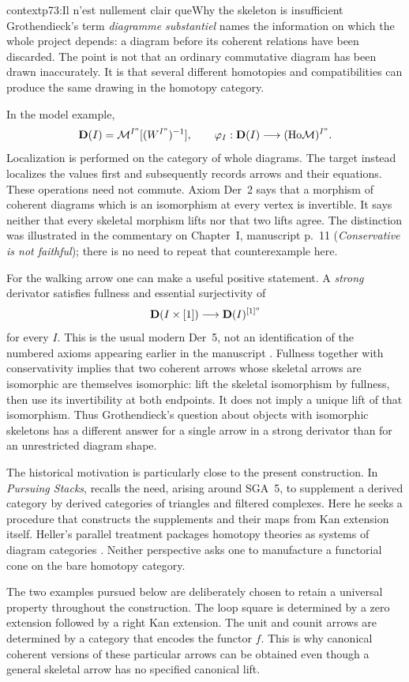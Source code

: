 \begin{dcomment}{context}{p73:Il n'est nullement clair que}{Why the skeleton is insufficient}
Grothendieck's term \emph{diagramme substantiel} names the information on which the whole project depends: a diagram before its coherent relations have been discarded. The point is not that an ordinary commutative diagram has been drawn inaccurately. It is that several different homotopies and compatibilities can produce the same drawing in the homotopy category.

In the model example,
\[
 \mathbf{D}(I)=\mathcal M^{I^o}[(W^{I^o})^{-1}],
 \qquad
 \varphi_I:\mathbf{D}(I)\longrightarrow(\mathrm{Ho}\mathcal M)^{I^o}.
\]
Localization is performed on the category of whole diagrams. The target instead localizes the values first and subsequently records arrows and their equations. These operations need not commute. Axiom Der~2 says that a morphism of coherent diagrams which is an isomorphism at every vertex is invertible. It says neither that every skeletal morphism lifts nor that two lifts agree. The distinction was illustrated in the commentary on Chapter~I, manuscript p.~11 (\emph{Conservative is not faithful}); there is no need to repeat that counterexample here.

For the walking arrow one can make a useful positive statement. A \emph{strong} derivator satisfies fullness and essential surjectivity of
\[
 \mathbf{D}(I\times[1])\longrightarrow\mathbf{D}(I)^{[1]^o}
\]
for every \(I\). This is the usual modern Der~5, not an identification of the numbered axioms appearing earlier in the manuscript \citep[Definition 1.8]{Groth2013}. Fullness together with conservativity implies that two coherent arrows whose skeletal arrows are isomorphic are themselves isomorphic: lift the skeletal isomorphism by fullness, then use its invertibility at both endpoints. It does not imply a unique lift of that isomorphism. Thus Grothendieck's question about objects with isomorphic skeletons has a different answer for a single arrow in a strong derivator than for an unrestricted diagram shape.

The historical motivation is particularly close to the present construction. In \emph{Pursuing Stacks}, \citet[Section 69, pp.~1--2 of the edited extract]{Grothendieck1983} recalls the need, arising around SGA~5, to supplement a derived category by derived categories of triangles and filtered complexes. Here he seeks a procedure that constructs the supplements and their maps from Kan extension itself. Heller's parallel treatment packages homotopy theories as systems of diagram categories \citep[Introduction and Chapter I]{Heller1988}. Neither perspective asks one to manufacture a functorial cone on the bare homotopy category.

The two examples pursued below are deliberately chosen to retain a universal property throughout the construction. The loop square is determined by a zero extension followed by a right Kan extension. The unit and counit arrows are determined by a category that encodes the functor \(f\). This is why canonical coherent versions of these particular arrows can be obtained even though a general skeletal arrow has no specified canonical lift.
\end{dcomment}


